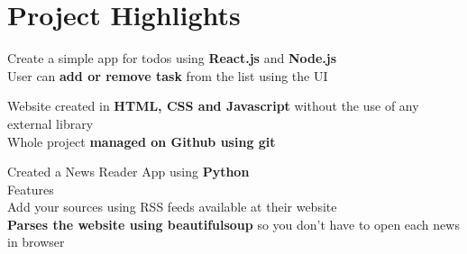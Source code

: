 \documentclass[]{Nikhil_Kadiyan_Resume}
\begin{document}
\section{Project Highlights}
\hrulefill



\pt Create a simple app for todos using \textbf{React.js} and \textbf{Node.js} \\
\pt User can \textbf{add or remove task} from the list using the UI
\sectionsep

\pt Website created in \textbf{HTML, CSS and Javascript} without the use of any external library \\
\pt Whole project \textbf{managed on Github using git} \\
\sectionsep

\pt Created a News Reader App using \textbf{Python} \\
\pt Features \\
\hspace{5mm} \pt Add your sources using RSS feeds available at their website \\
\hspace{5mm} \pt \textbf{Parses the website using beautifulsoup} so you don't have to open each news in browser \\
\sectionsep
\end{document}
